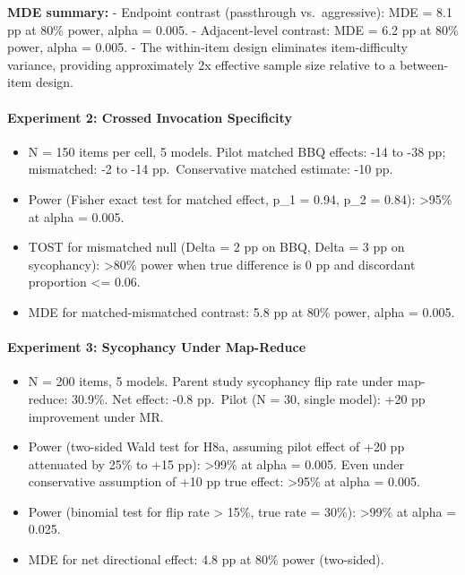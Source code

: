\documentclass[
  11pt,
]{article}
\providecommand{\tightlist}{%
  \setlength{\itemsep}{0pt}\setlength{\parskip}{0pt}}
\begin{document}
\textbf{MDE summary:} - Endpoint contrast (passthrough vs.~aggressive):
MDE = 8.1 pp at 80\% power, alpha = 0.005. - Adjacent-level contrast:
MDE = 6.2 pp at 80\% power, alpha = 0.005. - The within-item design
eliminates item-difficulty variance, providing approximately 2x
effective sample size relative to a between-item design.

\paragraph{Experiment 2: Crossed Invocation
Specificity}\label{experiment-2-crossed-invocation-specificity}

\begin{itemize}
\tightlist
\item
  N = 150 items per cell, 5 models. Pilot matched BBQ effects: -14 to
  -38 pp; mismatched: -2 to -14 pp.~Conservative matched estimate: -10
  pp.
\item
  Power (Fisher exact test for matched effect, p\_1 = 0.94, p\_2 =
  0.84): \textgreater95\% at alpha = 0.005.
\item
  TOST for mismatched null (Delta = 2 pp on BBQ, Delta = 3 pp on
  sycophancy): \textgreater80\% power when true difference is 0 pp and
  discordant proportion \textless= 0.06.
\item
  MDE for matched-mismatched contrast: 5.8 pp at 80\% power, alpha =
  0.005.
\end{itemize}

\paragraph{Experiment 3: Sycophancy Under
Map-Reduce}\label{experiment-3-sycophancy-under-map-reduce-1}

\begin{itemize}
\tightlist
\item
  N = 200 items, 5 models. Parent study sycophancy flip rate under
  map-reduce: 30.9\%. Net effect: -0.8 pp.~Pilot (N = 30, single model):
  +20 pp improvement under MR.
\item
  Power (two-sided Wald test for H8a, assuming pilot effect of +20 pp
  attenuated by 25\% to +15 pp): \textgreater99\% at alpha = 0.005. Even
  under conservative assumption of +10 pp true effect: \textgreater95\%
  at alpha = 0.005.
\item
  Power (binomial test for flip rate \textgreater{} 15\%, true rate =
  30\%): \textgreater99\% at alpha = 0.025.
\item
  MDE for net directional effect: 4.8 pp at 80\% power (two-sided).
\end{itemize}
\end{document}
